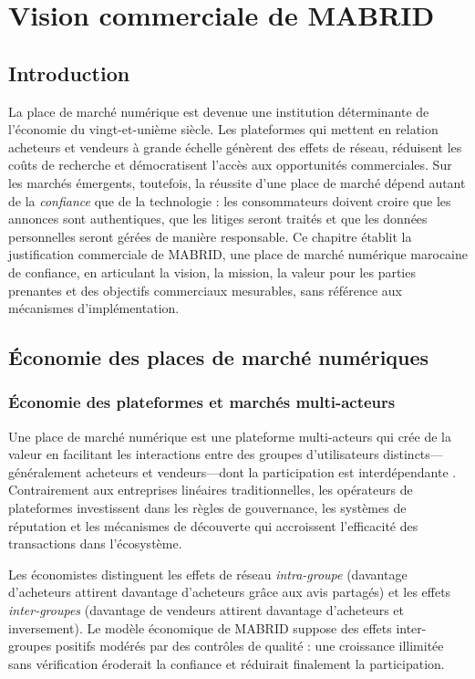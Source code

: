 \chapter{Vision commerciale de MABRID}
\label{ch:business-vision}

\section{Introduction}

La place de marché numérique est devenue une institution déterminante de l'économie du vingt-et-unième siècle. Les plateformes qui mettent en relation acheteurs et vendeurs à grande échelle génèrent des effets de réseau, réduisent les coûts de recherche et démocratisent l'accès aux opportunités commerciales. Sur les marchés émergents, toutefois, la réussite d'une place de marché dépend autant de la \emph{confiance} que de la technologie : les consommateurs doivent croire que les annonces sont authentiques, que les litiges seront traités et que les données personnelles seront gérées de manière responsable. Ce chapitre établit la justification commerciale de MABRID, une place de marché numérique marocaine de confiance, en articulant la vision, la mission, la valeur pour les parties prenantes et des objectifs commerciaux mesurables, sans référence aux mécanismes d'implémentation.

\section{Économie des places de marché numériques}

\subsection{Économie des plateformes et marchés multi-acteurs}

Une place de marché numérique est une plateforme multi-acteurs qui crée de la valeur en facilitant les interactions entre des groupes d'utilisateurs distincts---généralement acheteurs et vendeurs---dont la participation est interdépendante \parencite{rochet2003platform,evans2016matchmakers}. Contrairement aux entreprises linéaires traditionnelles, les opérateurs de plateformes investissent dans les règles de gouvernance, les systèmes de réputation et les mécanismes de découverte qui accroissent l'efficacité des transactions dans l'écosystème.

Les économistes distinguent les effets de réseau \emph{intra-groupe} (davantage d'acheteurs attirent davantage d'acheteurs grâce aux avis partagés) et les effets \emph{inter-groupes} (davantage de vendeurs attirent davantage d'acheteurs et inversement). Le modèle économique de MABRID suppose des effets inter-groupes positifs modérés par des contrôles de qualité : une croissance illimitée sans vérification éroderait la confiance et réduirait finalement la participation.

